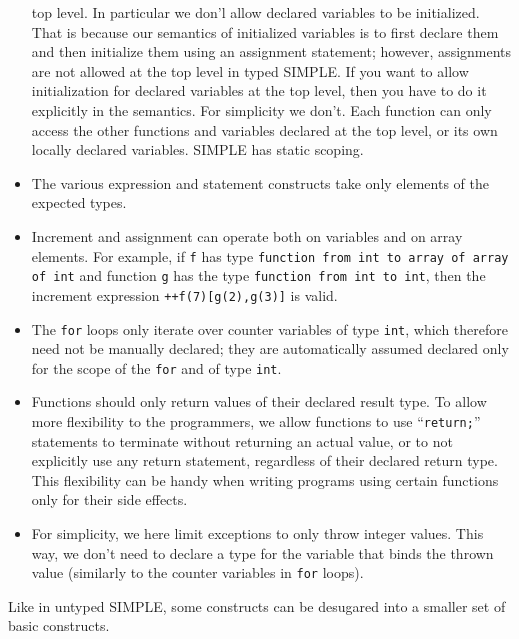 \begin{latexComment}
\begin{itemize}
top level.  In particular we don'l allow declared variables to be initialized.
That is because our semantics of initialized variables is to first declare
them and then initialize them using an assignment statement; however,
assignments are not allowed at the top level in typed SIMPLE.  If you want
to allow initialization for declared variables at the top level, then you
have to do it explicitly in the semantics.  For simplicity we don't.
Each function can only access the other functions and variables declared
at the top level, or its own locally declared variables.
SIMPLE has static scoping.
\item The various expression and statement constructs take only elements of
the expected types.
\item Increment and assignment can operate both on variables and on array
elements.  For example, if \texttt{f} has type
\texttt{function from int to array of array of int} and function
\texttt{g} has the type \texttt{function from int to int}, then the
increment expression \texttt{++f(7)[g(2),g(3)]} is valid.
\item The \texttt{for} loops only iterate over counter variables of type
\texttt{int}, which therefore need not be manually declared; they are
automatically assumed declared only for the scope of the \texttt{for} and of
type \texttt{int}.
\item Functions should only return values of their declared result type.
To allow more flexibility to the programmers, we allow functions to use
``\texttt{return;}'' statements to terminate without returning an actual
value, or to not explicitly use any return statement, regardless of their
declared return type.  This flexibility can be handy when writing programs
using certain functions only for their side effects.
\item For simplicity, we here limit exceptions to only throw integer values.
This way, we don't need to declare a type for the variable that binds the
thrown value (similarly to the counter variables in \texttt{for} loops).
\end{itemize}
Like in untyped SIMPLE, some constructs can be desugared into a smaller set of
basic constructs.
\end{latexComment}

\vspace*{3ex}
